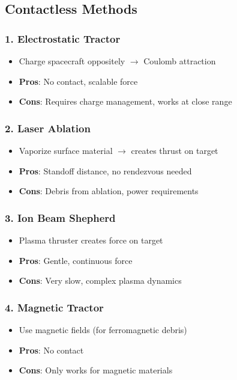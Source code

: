 \documentclass[11pt,a4paper]{article}
\begin{document}
\subsection{Contactless Methods}

\subsubsection{1. Electrostatic Tractor}
\begin{itemize}[leftmargin=*]
    \item Charge spacecraft oppositely $\rightarrow$ Coulomb attraction
    \item \textbf{Pros}: No contact, scalable force
    \item \textbf{Cons}: Requires charge management, works at close range
\end{itemize}

\subsubsection{2. Laser Ablation}
\begin{itemize}[leftmargin=*]
    \item Vaporize surface material $\rightarrow$ creates thrust on target
    \item \textbf{Pros}: Standoff distance, no rendezvous needed
    \item \textbf{Cons}: Debris from ablation, power requirements
\end{itemize}

\subsubsection{3. Ion Beam Shepherd}
\begin{itemize}[leftmargin=*]
    \item Plasma thruster creates force on target
    \item \textbf{Pros}: Gentle, continuous force
    \item \textbf{Cons}: Very slow, complex plasma dynamics
\end{itemize}

\subsubsection{4. Magnetic Tractor}
\begin{itemize}[leftmargin=*]
    \item Use magnetic fields (for ferromagnetic debris)
    \item \textbf{Pros}: No contact
    \item \textbf{Cons}: Only works for magnetic materials
\end{itemize}
\end{document}
